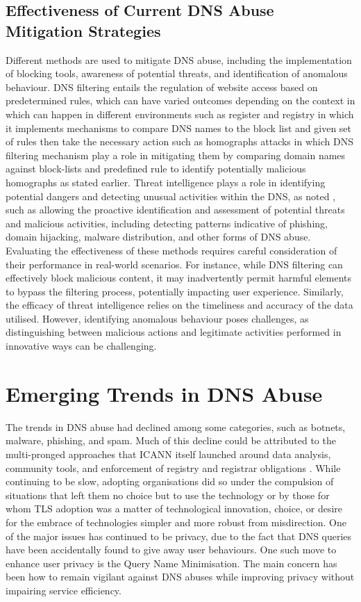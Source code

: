 \subsection{Effectiveness of Current DNS Abuse Mitigation Strategies}

Different methods are used to mitigate DNS abuse, including the implementation of blocking tools, awareness of potential threats, and identification of anomalous behaviour. DNS filtering entails the regulation of website access based on predetermined rules, which can have varied outcomes depending on the context in which can happen in different environments such as register and registry in which it implements mechanisms to compare DNS names to the block list and given set of rules then take the necessary action such as homographs attacks in which DNS filtering mechanism play a role in mitigating them by comparing domain names against block-lists and predefined rule to identify potentially malicious homographs as stated earlier. Threat intelligence plays a role in identifying potential dangers and detecting unusual activities within the DNS, as noted \cite{rizvi2022application}, such as allowing the proactive identification and assessment of potential threats and malicious activities, including detecting patterns indicative of phishing, domain hijacking, malware distribution, and other forms of DNS abuse. Evaluating the effectiveness of these methods requires careful consideration of their performance in real-world scenarios. For instance, while DNS filtering can effectively block malicious content, it may inadvertently permit harmful elements to bypass the filtering process, potentially impacting user experience. Similarly, the efficacy of threat intelligence relies on the timeliness and accuracy of the data utilised. However, identifying anomalous behaviour poses challenges, as distinguishing between malicious actions and legitimate activities performed in innovative ways can be challenging.


\section{Emerging Trends in DNS Abuse}

The trends in DNS abuse had declined among some categories, such as botnets, malware, phishing, and spam. Much of this decline could be attributed to the multi-pronged approaches that ICANN itself launched around data analysis, community tools, and enforcement of registry and registrar obligations \cite{icann_dns_security_threat}. While continuing to be slow, adopting organisations did so under the compulsion of situations that left them no choice but to use the technology or by those for whom TLS adoption was a matter of technological innovation, choice, or desire for the embrace of technologies simpler and more robust from misdirection. One of the major issues has continued to be privacy, due to the fact that DNS queries have been accidentally found to give away user behaviours. One such move to enhance user privacy is the Query Name Minimisation. The main concern has been how to remain vigilant against DNS abuses while improving privacy without impairing service efficiency.


